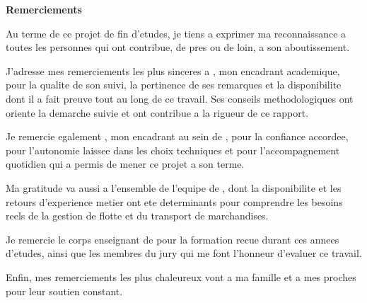 \sautLiminaire
{}
{}
\thispagestyle{empty}
\vspace*{1.5cm}

\begin{center}
  {\Huge\sffamily\bfseries\color{bleuTitre} Remerciements\par}
\end{center}

\vspace{1.5cm}


Au terme de ce projet de fin d'etudes, je tiens a exprimer ma
reconnaissance a toutes les personnes qui ont contribue, de pres ou de
loin, a son aboutissement.

\vspace{0.6cm}

J'adresse mes remerciements les plus sinceres a
\encadrantAcademique, mon encadrant academique, pour la qualite de son
suivi, la pertinence de ses remarques et la disponibilite dont il a fait
preuve tout au long de ce travail. Ses conseils methodologiques ont
oriente la demarche suivie et ont contribue a la rigueur de ce rapport.

\vspace{0.6cm}

Je remercie egalement \encadrantEntreprise, mon encadrant au sein de
\entreprise, pour la confiance accordee, pour l'autonomie laissee dans
les choix techniques et pour l'accompagnement quotidien qui a permis de
mener ce projet a son terme.

\vspace{0.6cm}

Ma gratitude va aussi a l'ensemble de l'equipe de \entreprise, dont la
disponibilite et les retours d'experience metier ont ete determinants
pour comprendre les besoins reels de la gestion de flotte et du
transport de marchandises.

\vspace{0.6cm}

Je remercie le corps enseignant de \etablissement{} pour la formation
recue durant ces annees d'etudes, ainsi que les membres du jury qui me
font l'honneur d'evaluer ce travail.

\vspace{0.6cm}

Enfin, mes remerciements les plus chaleureux vont a ma famille et a mes
proches pour leur soutien constant.

\vspace{1cm}
